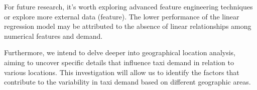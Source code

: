 \documentclass[11pt]{article}
\begin{document}
For future research, it's worth exploring advanced feature engineering techniques or explore more external data (feature). The lower performance of the linear regression model may be attributed to the absence of linear relationships among numerical features and demand.

Furthermore, we intend to delve deeper into geographical location analysis, aiming to uncover specific details that influence taxi demand in relation to various locations. This investigation will allow us to identify the factors that contribute to the variability in taxi demand based on different geographic areas.

\clearpage

\printbibliography
\end{document}
